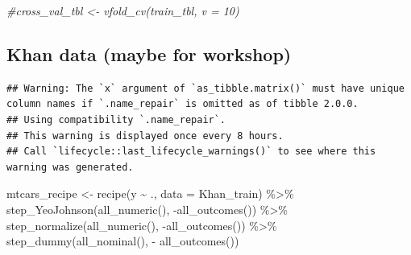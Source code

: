 \documentclass[
]{book}
\newenvironment{Shaded}{\begin{snugshade}}{\end{snugshade}}
\newcommand{\AttributeTok}[1]{\textcolor[rgb]{0.77,0.63,0.00}{#1}}
\newcommand{\CommentTok}[1]{\textcolor[rgb]{0.56,0.35,0.01}{\textit{#1}}}
\newcommand{\FunctionTok}[1]{\textcolor[rgb]{0.00,0.00,0.00}{#1}}
\newcommand{\NormalTok}[1]{#1}
\newcommand{\OtherTok}[1]{\textcolor[rgb]{0.56,0.35,0.01}{#1}}
\newcommand{\SpecialCharTok}[1]{\textcolor[rgb]{0.00,0.00,0.00}{#1}}
\begin{document}
\begin{Shaded}
\begin{Highlighting}[]
\CommentTok{\#cross\_val\_tbl \textless{}{-} vfold\_cv(train\_tbl, v = 10)}
\end{Highlighting}
\end{Shaded}

\hypertarget{khan-data-maybe-for-workshop}{%
\subsection{Khan data (maybe for workshop)}\label{khan-data-maybe-for-workshop}}

\begin{Shaded}
\end{Shaded}

\begin{verbatim}
## Warning: The `x` argument of `as_tibble.matrix()` must have unique column names if `.name_repair` is omitted as of tibble 2.0.0.
## Using compatibility `.name_repair`.
## This warning is displayed once every 8 hours.
## Call `lifecycle::last_lifecycle_warnings()` to see where this warning was generated.
\end{verbatim}

\begin{Shaded}
\end{Shaded}

\begin{Shaded}
\begin{Highlighting}[]
\NormalTok{mtcars\_recipe }\OtherTok{\textless{}{-}} \FunctionTok{recipe}\NormalTok{(y }\SpecialCharTok{\textasciitilde{}}\NormalTok{ ., }\AttributeTok{data =}\NormalTok{ Khan\_train) }\SpecialCharTok{\%\textgreater{}\%} 
                \FunctionTok{step\_YeoJohnson}\NormalTok{(}\FunctionTok{all\_numeric}\NormalTok{(), }\SpecialCharTok{{-}}\FunctionTok{all\_outcomes}\NormalTok{()) }\SpecialCharTok{\%\textgreater{}\%} 
                \FunctionTok{step\_normalize}\NormalTok{(}\FunctionTok{all\_numeric}\NormalTok{(), }\SpecialCharTok{{-}}\FunctionTok{all\_outcomes}\NormalTok{()) }\SpecialCharTok{\%\textgreater{}\%} 
                \FunctionTok{step\_dummy}\NormalTok{(}\FunctionTok{all\_nominal}\NormalTok{(), }\SpecialCharTok{{-}} \FunctionTok{all\_outcomes}\NormalTok{())}
\end{Highlighting}
\end{Shaded}
\end{document}
